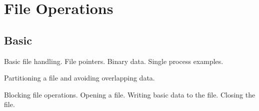 \chapter{File Operations}

\section{Basic}

Basic file handling. File pointers. Binary data. Single process examples.

Partitioning a file and avoiding overlapping data.

Blocking file operations. Opening a file. Writing basic data to the
file. Closing the file.

\lstset{language=C++, numbers=left, numberstyle=\tiny, stepnumber=1,
  numbersep=5pt, commentstyle=\scriptsize}
